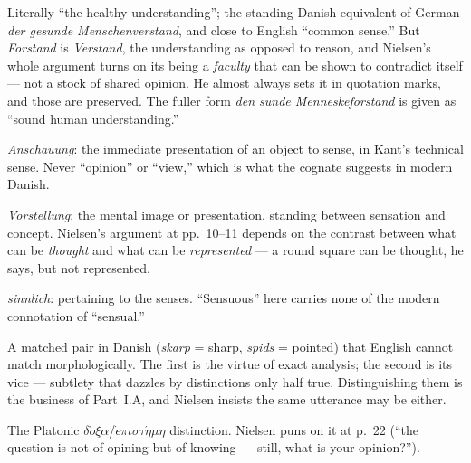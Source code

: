 \documentclass[12pt,a4paper]{book}
\begin{document}
\begin{description}[leftmargin=2.2em,style=nextline,itemsep=2pt]

\item[\emph{den sunde Forstand} --- ``sound understanding''] Literally ``the
healthy understanding''; the standing Danish equivalent of German
\textit{der gesunde Menschenverstand}, and close to English ``common sense.''
But \emph{Forstand} is \textit{Verstand}, the understanding as opposed to
reason, and Nielsen's whole argument turns on its being a \emph{faculty} that
can be shown to contradict itself --- not a stock of shared opinion. He almost
always sets it in quotation marks, and those are preserved. The fuller form
\emph{den sunde Menneskeforstand} is given as ``sound human understanding.''

\item[\emph{Anskuelse} --- ``intuition''] \textit{Anschauung}: the immediate
presentation of an object to sense, in Kant's technical sense. Never
``opinion'' or ``view,'' which is what the cognate suggests in modern Danish.

\item[\emph{Forestilling} --- ``representation''] \textit{Vorstellung}: the
mental image or presentation, standing between sensation and concept. Nielsen's
argument at pp.~10--11 depends on the contrast between what can be
\emph{thought} and what can be \emph{represented} --- a round square can be
thought, he says, but not represented.

\item[\emph{sandselig, Sandsning, Sandseindtryk} --- ``sensuous, sensation,
sense-impression''] \textit{sinnlich}: pertaining to the senses. ``Sensuous''
here carries none of the modern connotation of ``sensual.''

\item[\emph{Skarpsindighed} / \emph{Spidsfindighed} --- ``acumen'' /
``over-subtlety''] A matched pair in Danish (\emph{skarp} = sharp,
\emph{spids} = pointed) that English cannot match morphologically. The first is
the virtue of exact analysis; the second is its vice --- subtlety that dazzles
by distinctions only half true. Distinguishing them is the business of
Part~I.A, and Nielsen insists the same utterance may be either.

\item[\emph{Menen} / \emph{Viden} --- ``opining'' / ``knowing''] The Platonic
$\delta\acute{o}\xi\alpha$/$\dot{\epsilon}\pi\iota\sigma\tau\acute{\eta}\mu\eta$
distinction. Nielsen puns on it at p.~22 (``the question is not of opining but
of knowing --- still, what is your opinion?'').


\end{description}
\end{document}
